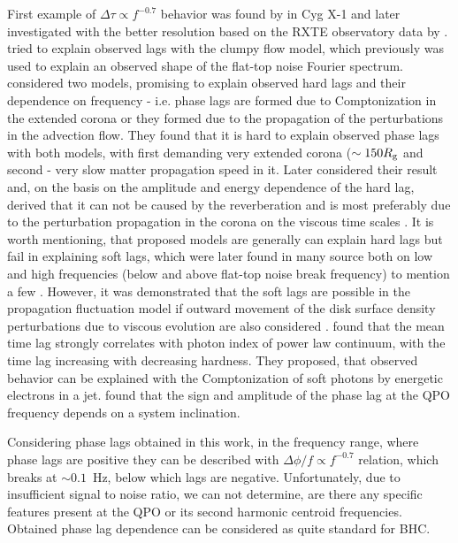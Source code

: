 \documentclass[a4paper,fleqn,usenatbib]{mnras}
\begin{document}
{First example of $\Delta \tau \propto f^{-0.7}$ behavior was found by \citet{1989Natur.342..773M} in Cyg X-1 and later investigated with the better resolution based on the RXTE observatory data by \citet{1999ApJ...517..355N}. 
\citet{1989Natur.342..773M} tried to explain observed lags with the clumpy flow model, which previously was used to explain an observed shape of the flat-top noise Fourier spectrum.
\citet{1999ApJ...515..726N} considered two models, promising to explain observed hard lags and their dependence on frequency - i.e. phase lags are formed due to Comptonization in the extended corona or they formed due to the propagation of the perturbations in the advection flow.  
They found that it is hard to explain observed phase lags with both models, with first demanding very extended corona ($\sim150 R_{\rm g}$ and second - very slow matter propagation speed in it.
Later \citet{2001MNRAS.327..799K} considered their result and, on the basis on the amplitude and energy dependence of the hard lag, derived that it can not be caused by the reverberation and is most preferably due to the perturbation propagation in the corona on the viscous time scales \citep[see also][on simulations results]{2006MNRAS.367..801A}.
It is worth mentioning, that proposed models are generally can explain hard lags but fail in explaining soft lags, which were later found in many source both on low and high frequencies (below and above flat-top noise break frequency) to mention a few \citep[][]{2010MNRAS.407.2166G, 2012MNRAS.427.2985C, 2017MNRAS.465.1926Y, 2017MNRAS.464.2643V}.
However, it was demonstrated that the soft lags are possible in the propagation fluctuation model if outward movement of the disk surface density perturbations due to viscous evolution are also considered \citep{2017arXiv170707578M}.  
\citet{2018MNRAS.473.4644R} found that the mean time lag strongly correlates with photon index of power law continuum, with the time lag increasing with decreasing hardness. 
They proposed, that observed behavior can be explained with the Comptonization of soft photons by energetic electrons in a jet.
\citet{2017MNRAS.464.2643V} found that the sign and amplitude of the phase lag at the QPO frequency depends on a system inclination.

Considering phase lags obtained in this work, in the frequency range, where phase lags are positive they can be described with  $\Delta \phi / f \propto f^{-0.7}$ relation, which breaks at $\sim 0.1$~Hz, below which lags are negative.
Unfortunately, due to insufficient signal to noise ratio, we can not determine, are there any specific features present at the QPO or its second harmonic centroid frequencies.    
Obtained phase lag dependence can be considered as quite standard for BHC.
}
\end{document}
